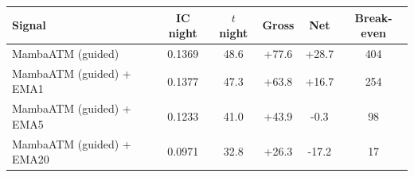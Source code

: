 {\footnotesize
\setlength{\tabcolsep}{3pt}
\begin{tabular}{lccccc}
\toprule
\textbf{Signal} & \textbf{IC night} & \textbf{$t$ night} & \textbf{Gross} & \textbf{Net} & \textbf{Break-even} \\
\midrule
MambaATM (guided) & 0.1369 & 48.6 & +77.6 & +28.7 & 404 \\
MambaATM (guided) + EMA1 & 0.1377 & 47.3 & +63.8 & +16.7 & 254 \\
MambaATM (guided) + EMA5 & 0.1233 & 41.0 & +43.9 & -0.3 & 98 \\
MambaATM (guided) + EMA20 & 0.0971 & 32.8 & +26.3 & -17.2 & 17 \\
\bottomrule
\end{tabular}
}
